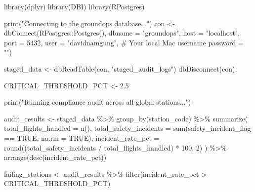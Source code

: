 \documentclass[
  letterpaper,
  DIV=11,
  numbers=noendperiod]{scrartcl}
\newenvironment{Shaded}{\begin{snugshade}}{\end{snugshade}}
\newcommand{\AttributeTok}[1]{\textcolor[rgb]{0.40,0.45,0.13}{#1}}
\newcommand{\CommentTok}[1]{\textcolor[rgb]{0.37,0.37,0.37}{#1}}
\newcommand{\ConstantTok}[1]{\textcolor[rgb]{0.56,0.35,0.01}{#1}}
\newcommand{\DecValTok}[1]{\textcolor[rgb]{0.68,0.00,0.00}{#1}}
\newcommand{\FloatTok}[1]{\textcolor[rgb]{0.68,0.00,0.00}{#1}}
\newcommand{\FunctionTok}[1]{\textcolor[rgb]{0.28,0.35,0.67}{#1}}
\newcommand{\NormalTok}[1]{\textcolor[rgb]{0.00,0.23,0.31}{#1}}
\newcommand{\OtherTok}[1]{\textcolor[rgb]{0.00,0.23,0.31}{#1}}
\newcommand{\SpecialCharTok}[1]{\textcolor[rgb]{0.37,0.37,0.37}{#1}}
\newcommand{\StringTok}[1]{\textcolor[rgb]{0.13,0.47,0.30}{#1}}
\begin{document}
\begin{Shaded}
\begin{Highlighting}[]
\FunctionTok{library}\NormalTok{(dplyr)}
\FunctionTok{library}\NormalTok{(DBI)}
\FunctionTok{library}\NormalTok{(RPostgres)}

\FunctionTok{print}\NormalTok{(}\StringTok{"Connecting to the \textquotesingle{}groundops\textquotesingle{} database..."}\NormalTok{)}
\NormalTok{con }\OtherTok{\textless{}{-}} \FunctionTok{dbConnect}\NormalTok{(RPostgres}\SpecialCharTok{::}\FunctionTok{Postgres}\NormalTok{(),}
                 \AttributeTok{dbname =} \StringTok{"groundops"}\NormalTok{,}
                 \AttributeTok{host =} \StringTok{"localhost"}\NormalTok{,}
                 \AttributeTok{port =} \DecValTok{5432}\NormalTok{,}
                 \AttributeTok{user =} \StringTok{"davidnamgung"}\NormalTok{, }\CommentTok{\# Your local Mac username}
                 \AttributeTok{password =} \StringTok{""}\NormalTok{)}

\NormalTok{staged\_data }\OtherTok{\textless{}{-}} \FunctionTok{dbReadTable}\NormalTok{(con, }\StringTok{"staged\_audit\_logs"}\NormalTok{)}
\FunctionTok{dbDisconnect}\NormalTok{(con)}

\NormalTok{CRITICAL\_THRESHOLD\_PCT }\OtherTok{\textless{}{-}} \FloatTok{2.5} 

\FunctionTok{print}\NormalTok{(}\StringTok{"Running compliance audit across all global stations..."}\NormalTok{)}

\NormalTok{audit\_results }\OtherTok{\textless{}{-}}\NormalTok{ staged\_data }\SpecialCharTok{\%\textgreater{}\%}
  \FunctionTok{group\_by}\NormalTok{(station\_code) }\SpecialCharTok{\%\textgreater{}\%}
  \FunctionTok{summarize}\NormalTok{(}
    \AttributeTok{total\_flights\_handled =} \FunctionTok{n}\NormalTok{(),}
    \AttributeTok{total\_safety\_incidents =} \FunctionTok{sum}\NormalTok{(safety\_incident\_flag }\SpecialCharTok{==} \ConstantTok{TRUE}\NormalTok{, }\AttributeTok{na.rm =} \ConstantTok{TRUE}\NormalTok{),}
    \AttributeTok{incident\_rate\_pct =} \FunctionTok{round}\NormalTok{((total\_safety\_incidents }\SpecialCharTok{/}\NormalTok{ total\_flights\_handled) }\SpecialCharTok{*} \DecValTok{100}\NormalTok{, }\DecValTok{2}\NormalTok{)}
\NormalTok{  ) }\SpecialCharTok{\%\textgreater{}\%}
  \FunctionTok{arrange}\NormalTok{(}\FunctionTok{desc}\NormalTok{(incident\_rate\_pct))}

\NormalTok{failing\_stations }\OtherTok{\textless{}{-}}\NormalTok{ audit\_results }\SpecialCharTok{\%\textgreater{}\%} \FunctionTok{filter}\NormalTok{(incident\_rate\_pct }\SpecialCharTok{\textgreater{}}\NormalTok{ CRITICAL\_THRESHOLD\_PCT)}


\end{Highlighting}
\end{Shaded}
\end{document}
